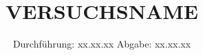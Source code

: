 




\subject{VXXX}
\title{VERSUCHSNAME}
\date{
  Durchführung: xx.xx.xx
  \hspace{3em}
  Abgabe: xx.xx.xx
}



\maketitle
\thispagestyle{empty}
\tableofcontents
\newpage





%



\printbibliography{}










%
%
%




%
